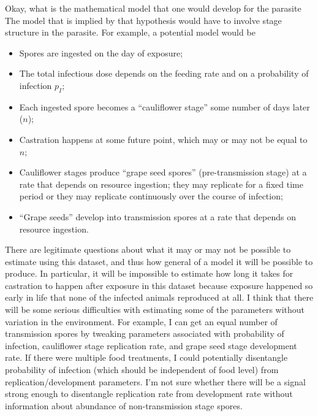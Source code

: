 \documentclass[11pt,reqno,final,pdftex]{amsart}\usepackage[]{graphicx}\usepackage[]{color}
\theoremstyle{plain}
\numberwithin{equation}{part}
\begin{document}
Okay, what is the mathematical model that one would develop for the parasite
The model that is implied by that hypothesis would have to involve stage structure in the parasite.
For example, a potential model would be
\begin{itemize}
\item Spores are ingested on the day of exposure;
\item The total infectious dose depends on the feeding rate and on a
  probability of infection $p_I$;
\item Each ingested spore becomes a ``cauliflower stage'' some number
  of days later ($n$);
\item Castration happens at some future point, which may or may not be
  equal to $n$;
\item Cauliflower stages produce ``grape seed spores''
  (pre-transmission stage) at a rate that depends on resource
  ingestion; they may replicate for a fixed time period or they may
  replicate continuously over the course of infection;
\item ``Grape seeds'' develop into transmission spores at a rate that
  depends on resource ingestion.
\end{itemize}

There are legitimate questions about what it may or may not be
possible to estimate using this dataset, and thus how general of a
model it will be possible to produce.
In particular, it will be impossible to estimate how long it takes for
castration to happen after exposure in this dataset because exposure
happened so early in life that none of the infected animals reproduced
at all.
I think that there will be some serious difficulties with estimating
some of the parameters without variation in the environment.
For example, I can get an equal number of transmission spores by tweaking
parameters associated with probability of infection, cauliflower stage
replication rate, and grape seed stage development rate.
If there were multiple food treatments, I could potentially
disentangle probability of infection (which should be independent of
food level) from replication/development parameters.
I'm not sure whether there will be a signal strong enough to
disentangle replication rate from development rate without information
about abundance of non-transmission stage spores.
\end{document}
